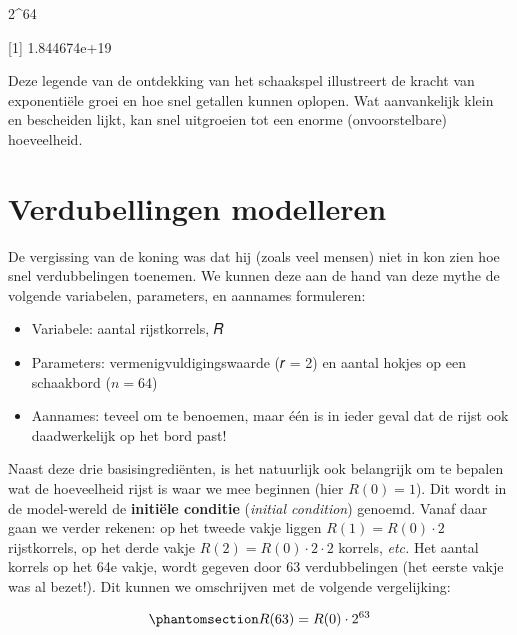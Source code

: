\documentclass[
  a4paper,
]{scrbook}
\newenvironment{Shaded}{\begin{snugshade}}{\end{snugshade}}
\newcommand{\DecValTok}[1]{\textcolor[rgb]{0.68,0.00,0.00}{#1}}
\newcommand{\NormalTok}[1]{\textcolor[rgb]{0.00,0.23,0.31}{#1}}
\newcommand{\SpecialCharTok}[1]{\textcolor[rgb]{0.37,0.37,0.37}{#1}}
\providecommand{\tightlist}{%
  \setlength{\itemsep}{0pt}\setlength{\parskip}{0pt}}\usepackage{longtable,booktabs,array}
\theoremstyle{definition}
\theoremstyle{remark}
\begin{document}
\begin{Shaded}
\begin{Highlighting}[]
\DecValTok{2}\SpecialCharTok{\^{}}\DecValTok{64}
\end{Highlighting}
\end{Shaded}

\begin{Shaded}
\begin{Highlighting}[]
\NormalTok{[1] 1.844674e+19}
\end{Highlighting}
\end{Shaded}

Deze legende van de ontdekking van het schaakspel illustreert de kracht
van exponentiële groei en hoe snel getallen kunnen oplopen. Wat
aanvankelijk klein en bescheiden lijkt, kan snel uitgroeien tot een
enorme (onvoorstelbare) hoeveelheid.

\section{Verdubellingen modelleren}\label{verdubellingen-modelleren}

De vergissing van de koning was dat hij (zoals veel mensen) niet in kon
zien hoe snel verdubbelingen toenemen. We kunnen deze aan de hand van
deze mythe de volgende variabelen, parameters, en aannames formuleren:

\begin{itemize}
\tightlist
\item
  Variabele: aantal rijstkorrels, 𝑅
\item
  Parameters: vermenigvuldigingswaarde (𝑟 = 2) en aantal hokjes op een
  schaakbord (\(n=64\))
\item
  Aannames: teveel om te benoemen, maar één is in ieder geval dat de
  rijst ook daadwerkelijk op het bord past!
\end{itemize}

Naast deze drie basisingrediënten, is het natuurlijk ook belangrijk om
te bepalen wat de hoeveelheid rijst is waar we mee beginnen (hier
\(R(0) = 1\)). Dit wordt in de model-wereld de \textbf{initiële
conditie} (\emph{initial condition}) genoemd. Vanaf daar gaan we verder
rekenen: op het tweede vakje liggen \(R(1) = R(0) \cdot 2\)
rijstkorrels, op het derde vakje \(R(2) = R(0) \cdot 2 \cdot 2\)
korrels, \emph{etc.} Het aantal korrels op het 64e vakje, wordt gegeven
door 63 verdubbelingen (het eerste vakje was al bezet!). Dit kunnen we
omschrijven met de volgende vergelijking:

\begin{equation}\phantomsection\label{eq-rijst}{
R(63) = R(0) \cdot 2^{63}
}\end{equation}
\end{document}
